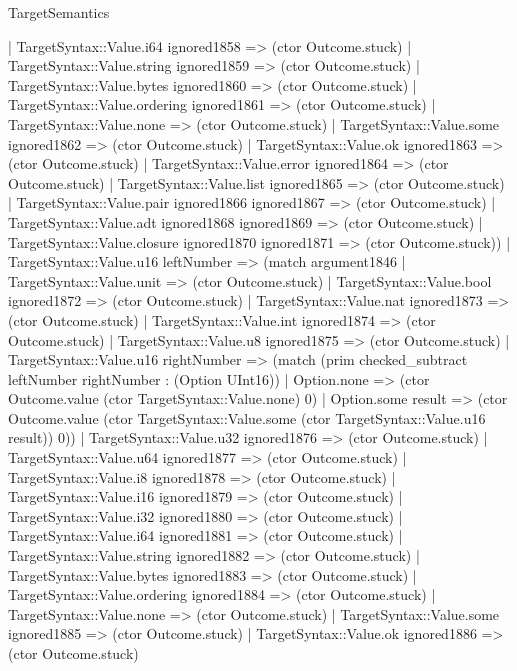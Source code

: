 \begin{lexlean}{TargetSemantics}
\begin{semanticmodule}
{              | TargetSyntax::Value.i64 ignored1858 => (ctor Outcome.stuck)
              | TargetSyntax::Value.string ignored1859 => (ctor Outcome.stuck)
              | TargetSyntax::Value.bytes ignored1860 => (ctor Outcome.stuck)
              | TargetSyntax::Value.ordering ignored1861 => (ctor Outcome.stuck)
              | TargetSyntax::Value.none => (ctor Outcome.stuck)
              | TargetSyntax::Value.some ignored1862 => (ctor Outcome.stuck)
              | TargetSyntax::Value.ok ignored1863 => (ctor Outcome.stuck)
              | TargetSyntax::Value.error ignored1864 => (ctor Outcome.stuck)
              | TargetSyntax::Value.list ignored1865 => (ctor Outcome.stuck)
              | TargetSyntax::Value.pair ignored1866 ignored1867 => (ctor Outcome.stuck)
              | TargetSyntax::Value.adt ignored1868 ignored1869 => (ctor Outcome.stuck)
              | TargetSyntax::Value.closure ignored1870 ignored1871 => (ctor Outcome.stuck))
            | TargetSyntax::Value.u16 leftNumber => (match argument1846
              | TargetSyntax::Value.unit => (ctor Outcome.stuck)
              | TargetSyntax::Value.bool ignored1872 => (ctor Outcome.stuck)
              | TargetSyntax::Value.nat ignored1873 => (ctor Outcome.stuck)
              | TargetSyntax::Value.int ignored1874 => (ctor Outcome.stuck)
              | TargetSyntax::Value.u8 ignored1875 => (ctor Outcome.stuck)
              | TargetSyntax::Value.u16 rightNumber => (match (prim checked_subtract leftNumber rightNumber : (Option UInt16))
                | Option.none => (ctor Outcome.value (ctor TargetSyntax::Value.none) 0)
                | Option.some result => (ctor Outcome.value (ctor TargetSyntax::Value.some (ctor TargetSyntax::Value.u16 result)) 0))
              | TargetSyntax::Value.u32 ignored1876 => (ctor Outcome.stuck)
              | TargetSyntax::Value.u64 ignored1877 => (ctor Outcome.stuck)
              | TargetSyntax::Value.i8 ignored1878 => (ctor Outcome.stuck)
              | TargetSyntax::Value.i16 ignored1879 => (ctor Outcome.stuck)
              | TargetSyntax::Value.i32 ignored1880 => (ctor Outcome.stuck)
              | TargetSyntax::Value.i64 ignored1881 => (ctor Outcome.stuck)
              | TargetSyntax::Value.string ignored1882 => (ctor Outcome.stuck)
              | TargetSyntax::Value.bytes ignored1883 => (ctor Outcome.stuck)
              | TargetSyntax::Value.ordering ignored1884 => (ctor Outcome.stuck)
              | TargetSyntax::Value.none => (ctor Outcome.stuck)
              | TargetSyntax::Value.some ignored1885 => (ctor Outcome.stuck)
              | TargetSyntax::Value.ok ignored1886 => (ctor Outcome.stuck)
}
\end{semanticmodule}
\end{lexlean}
